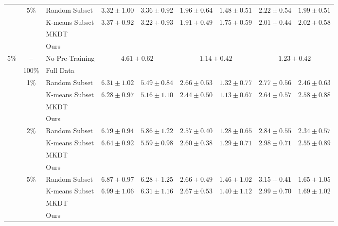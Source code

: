 \begin{table}[t]
{\begin{tabular}{@{}cclcccccc@{}}
& \multirow{4}{*}{5\%} & Random Subset
& $3.32 \pm 1.00$ & $3.36 \pm 0.92$
& $1.96 \pm 0.64$ & $1.48 \pm 0.51$
& $2.22 \pm 0.54$ & $1.99 \pm 0.51$ \\
& & K-means Subset
& $3.37 \pm 0.92$ & $3.22 \pm 0.93$
& $1.91 \pm 0.49$ & $1.75 \pm 0.59$
& $2.01 \pm 0.44$ & $2.02 \pm 0.58$ \\
& & MKDT & & & & & & \\
& & Ours
& &
& &
&  &  \\

\midrule

\multirow{14}{*}{5\%}
& -- & No Pre-Training
& \multicolumn{2}{c}{$4.61 \pm 0.62$}
& \multicolumn{2}{c}{$1.14 \pm 0.42$}
& \multicolumn{2}{c}{$1.23 \pm 0.42$} \\
\cmidrule(lr){2-9}

& 100\% & Full Data
&  & 
&  & 
&  &  \\
\cmidrule(lr){2-9}

& \multirow{4}{*}{1\%} & Random Subset
& $6.31 \pm 1.02$ & $5.49 \pm 0.84$
& $2.66 \pm 0.53$ & $1.32 \pm 0.77$
& $2.77 \pm 0.56$ & $2.46 \pm 0.63$ \\
& & K-means Subset
& $6.28 \pm 0.97$ & $5.16 \pm 1.10$
& $2.44 \pm 0.50$ & $1.13 \pm 0.67$
& $2.64 \pm 0.57$ & $2.58 \pm 0.88$ \\
& & MKDT & & & & & & \\
& & Ours
& &
& &
& & \\
\cmidrule(lr){2-9}

& \multirow{4}{*}{2\%} & Random Subset
& $6.79 \pm 0.94$ & $5.86 \pm 1.22$
& $2.57 \pm 0.40$ & $1.28 \pm 0.65$
& $2.84 \pm 0.55$ & $2.34 \pm 0.57$ \\
& & K-means Subset
& $6.64 \pm 0.92$ & $5.59 \pm 0.98$
& $2.60 \pm 0.38$ & $1.29 \pm 0.71$
& $2.98 \pm 0.71$ & $2.55 \pm 0.89$ \\
& & MKDT & & & & & & \\
& & Ours
& &
& &
&  &  \\
\cmidrule(lr){2-9}

& \multirow{4}{*}{5\%} & Random Subset
& $6.87 \pm 0.97$ & $6.28 \pm 1.25$
& $2.66 \pm 0.49$ & $1.46 \pm 1.02$
& $3.15 \pm 0.41$ & $1.65 \pm 1.05$ \\
& & K-means Subset
& $6.99 \pm 1.06$ & $6.31 \pm 1.16$
& $2.67 \pm 0.53$ & $1.40 \pm 1.12$
& $2.99 \pm 0.70$ & $1.69 \pm 1.02$ \\
& & MKDT & & & & & & \\
& & Ours
&  & 
& &
&  &  \\

\bottomrule
\end{tabular}%
}
\end{table}



